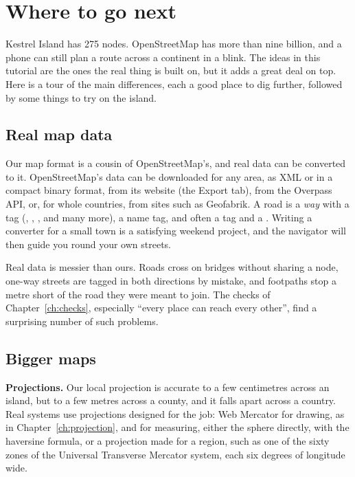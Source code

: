 \chapter{Where to go next}\label{ch:next}

Kestrel Island has 275 nodes. OpenStreetMap has more than nine billion,
and a phone can still plan a route across a continent in a blink. The ideas
in this tutorial are the ones the real thing is built on, but it adds a
great deal on top. Here is a tour of the main differences, each a good
place to dig further, followed by some things to try on the island.

\section{Real map data}

Our map format is a cousin of OpenStreetMap's, and real data can be
converted to it. OpenStreetMap's data can be downloaded for any area, as
XML or in a compact binary format, from its website (the Export tab), from
the Overpass API, or, for whole countries, from sites such as Geofabrik.
A road is a \emph{way} with a  tag (,
, ,  and many more), a name
tag, and often a  tag and a . Writing a
converter for a small town is a satisfying weekend project, and the
navigator will then guide you round your own streets.

Real data is messier than ours. Roads cross on bridges without sharing a
node, one-way streets are tagged in both directions by mistake, and
footpaths stop a metre short of the road they were meant to join. The
checks of Chapter~\ref{ch:checks}, especially ``every place can reach every
other'', find a surprising number of such problems.

\section{Bigger maps}

\textbf{Projections.} Our local projection is accurate to a few
centimetres across an island, but to a few metres across a county, and it
falls apart across a country. Real systems use projections designed for
the job: Web Mercator for drawing, as in Chapter~\ref{ch:projection}, and
for measuring, either the sphere directly, with the haversine formula, or
a projection made for a region, such as one of the sixty zones of the
Universal Transverse Mercator system, each six degrees of longitude wide.

